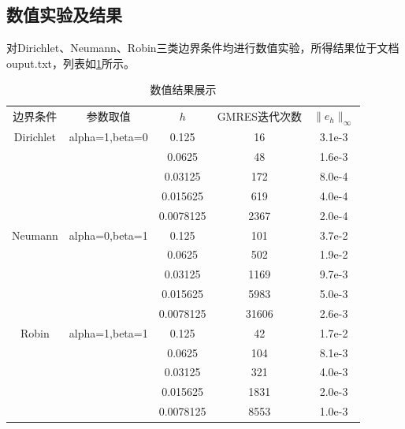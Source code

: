\documentclass[11pt,a4 paper,one side]{article}
\begin{document}
\subsection{数值实验及结果}
对Dirichlet、Neumann、Robin三类边界条件均进行数值实验，所得结果位于文档ouput.txt，列表如\ref{数值结果展示}所示。
\begin{table}
    \centering
    \begin{tabular}{c c c c c}
        \hline
        边界条件&参数取值&$h$&GMRES迭代次数&$\|e_h\|_{\infty}$\\
        Dirichlet&alpha=1,beta=0&0.125&16&3.1e-3\\
        &&0.0625&48&1.6e-3\\
        &&0.03125&172&8.0e-4\\
        &&0.015625&619&4.0e-4\\
        &&0.0078125&2367&2.0e-4\\

        Neumann&alpha=0,beta=1&0.125&101&3.7e-2\\
        &&0.0625&502&1.9e-2\\
        &&0.03125&1169&9.7e-3\\
        &&0.015625&5983&5.0e-3\\
        &&0.0078125&31606&2.6e-3\\
        
        Robin&alpha=1,beta=1&0.125&42&1.7e-2\\
        &&0.0625&104&8.1e-3\\
        &&0.03125&321&4.0e-3\\
        &&0.015625&1831&2.0e-3\\
        &&0.0078125&8553&1.0e-3\\
        
    \end{tabular}
    \caption{数值结果展示}
    \label{数值结果展示}
\end{table}
\end{document}
